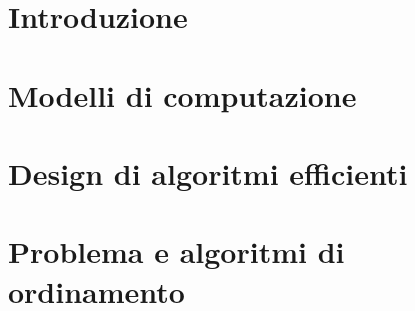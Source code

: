 \documentclass[12pt]{article}
\begin{document}


\tableofcontents
\restoregeometry

\section{Introduzione}


\section{Modelli di computazione}


\section{Design di algoritmi efficienti}


\section{Problema e algoritmi di ordinamento}

\end{document}
